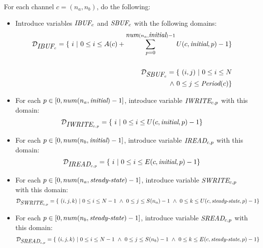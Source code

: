 For each channel $c = (n_a, n_b)$, do the following:
\begin{itemize}

\item Introduce variables $\mbox{\it IBUF}_c$ and $\mbox{\it SBUF}_c$ with the following domains:
\begin{align*}
{\cal D}_{\mt{IBUF}_c} = \{~i~|~0 \le i \le A(c) +
\sum_{p=0}^{\mt{num}(n_a, \mt{initial})-1} U(c, \mt{initial}, p) - 1\} \\ ~ \\
%
{\cal D}_{\mt{SBUF}_c} = \{ ~(i,j)~|~0 \le i \le N \\
~\wedge~ 0 \le j \le \mt{Period}(c) \}
\end{align*}

\item For each $p \in [0, num(n_a, \mbox{\it initial})-1]$, introduce
variable $\mbox{\it IWRITE}_{c, p}$ with this domain:
\begin{align*}
{\cal D}_{\mbox{\it IWRITE}_{c, p}} = \{~i~|~0 \le i \le U(c, \mbox{\it initial}, p) - 1\} \\
\end{align*}

\item For each $p \in [0, num(n_b, \mbox{\it initial})-1]$, introduce
variable $\mbox{\it IREAD}_{c, p}$ with this domain:
\begin{align*}
{\cal D}_{\mbox{\it IREAD}_{c, p}} = \{~i~|~0 \le i \le E(c, \mbox{\it initial}, p) - 1\} \\
\end{align*}

\item For each $p \in [0, num(n_a, \mbox{\it steady-state})-1]$, introduce
variable $\mbox{\it SWRITE}_{c, p}$ with this domain:
\begin{align*}
{\cal D}_{\mbox{\it SWRITE}_{c, p}} = \{~(i,j,k)~|~0 \le i \le N-1 ~\wedge~ 0 \le j \le S(n_a) - 1 ~\wedge~ 0 \le k \le U(c, \mbox{\it steady-state}, p) - 1\} \\
\end{align*}

\item For each $p \in [0, num(n_b, \mbox{\it steady-state})-1]$, introduce
variable $\mbox{\it SREAD}_{c, p}$ with this domain:
\begin{align*}
{\cal D}_{\mbox{\it SREAD}_{c, p}} = \{~(i,j,k)~|~0 \le i \le N-1 ~\wedge~ 0 \le j \le S(n_b) - 1 ~\wedge~ 0 \le k \le E(c, \mbox{\it steady-state}, p) - 1\} \\
\end{align*}


\end{itemize}
